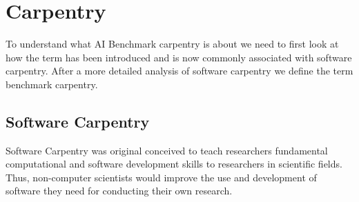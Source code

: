 \begin{comment}
This document collects the ideas about what is needed for researchers to familiarize themselves with benchmarking. In particular, it will help by supporting the MLCommons community to educate the next generation of researchers to familiarize them with benchmarking. 
 
\TODO{IN THE NEXT SECTIONS WE WANT TO DESCRIBE EACH OF THEM  IN MORE DETAIL}

\TODO{INTEGRATE THE HIERARCHY DIAGRAMS}

\TODO{INTEGRATE THE TABLES AND MAKE A SURVEY OF BENCHMARKS}

\TODO{Integrate \url{https://www.nature.com/articles/s42254-022-00441-7}, also paper with Gregor}

\TODO{OLDER NOTES:}

HPC benchmarking
TOP500
Green 500 and HPC innovation: requires monitoring of instantaneous power consumption (levels 1, 2, 3)
Desktop benchmarking
specint/float (int8..in32 and FP64 down to FP8)
Processors and their cores: sockets and NUMA issues
GPUs: on-node accelerator connectivity
filesystem
. . .
Compute center benchmarking
Which resources and applications are we interested in, 
Which dimensionalities are measured and what is the objective
\end{comment}

\section{Carpentry}
\label{subsec:towards-carp}


To understand what AI Benchmark carpentry is about we need to first look at how the term has been introduced and is now commonly associated with software carpentry. After a more detailed analysis of software carpentry we define the term benchmark carpentry.

\subsection{Software Carpentry}
\label{subsec:towards-swCarp}

Software Carpentry was original conceived \cite{wilson2014software} to teach researchers fundamental computational and software development skills to researchers in scientific fields.
Thus, non-computer scientists would improve the use and development of software they need for conducting their own research.

